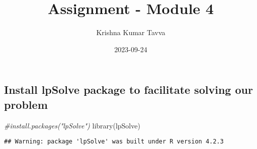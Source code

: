 \documentclass[
]{article}
\title{Assignment - Module 4}
\author{Krishna Kumar Tavva}
\date{2023-09-24}
\newenvironment{Shaded}{\begin{snugshade}}{\end{snugshade}}
\newcommand{\CommentTok}[1]{\textcolor[rgb]{0.56,0.35,0.01}{\textit{#1}}}
\newcommand{\FunctionTok}[1]{\textcolor[rgb]{0.00,0.00,0.00}{#1}}
\newcommand{\NormalTok}[1]{#1}
\begin{document}
\maketitle

\hypertarget{install-lpsolve-package-to-facilitate-solving-our-problem}{%
\subsection{Install lpSolve package to facilitate solving our
problem}\label{install-lpsolve-package-to-facilitate-solving-our-problem}}

\begin{Shaded}
\begin{Highlighting}[]
\CommentTok{\#install.packages("lpSolve") }
\FunctionTok{library}\NormalTok{(lpSolve)}
\end{Highlighting}
\end{Shaded}

\begin{verbatim}
## Warning: package 'lpSolve' was built under R version 4.2.3
\end{verbatim}
\end{document}
